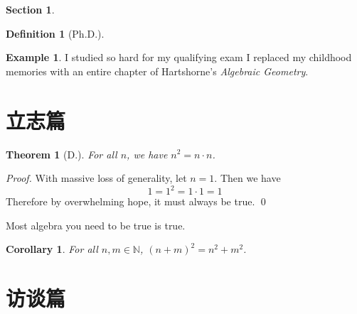 \documentclass{beamer}	%
\newcommand{\N}{\mathbb{N}}
\newcommand{\pf}{\noindent\emph{Proof. }}
\theoremstyle{plain}
\newtheorem{thm}{Theorem}[section]
\newtheorem{cor}{Corollary}[section]
\theoremstyle{definition}
\newtheorem{ex}{Example}[section]
\newtheorem{se}{Section}[section]
\newtheorem{dfn}{Definition}[section]
\theoremstyle{remark}
\numberwithin{equation}{section}
\begin{document}
\begin{frame}

	\begin{se}
	
	\end{se}

\begin{dfn}[Ph.D.]


\end{dfn}

\begin{ex}
I studied so hard for my qualifying exam I replaced my childhood memories with an entire chapter of Hartshorne's \emph{Algebraic Geometry}.
\end{ex}
\end{frame}



\section{立志篇}



\begin{frame}
\begin{thm}[D.]
For all $n$, we have $n^2= n \cdot n$.
\end{thm}

\pf With massive loss of generality, let $n=1$. Then we have
	\[
	1=1^2= 1 \cdot 1= 1
	\]
Therefore by overwhelming hope, it must always be true. \qed
\end{frame}



\begin{frame}
Most algebra you need to be true is true.
\begin{cor}
For all $n,m \in \N$, $(n+m)^2= n^2 + m^2$.
\end{cor}
\end{frame}



\section{访谈篇}
\end{document}
